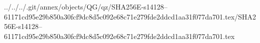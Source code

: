 ../../../.git/annex/objects/QG/qz/SHA256E-s14128--61171cd95e29b850a30fcf9dc8d5c092e68c71e279fde2ddcd1aa31f077da701.tex/SHA256E-s14128--61171cd95e29b850a30fcf9dc8d5c092e68c71e279fde2ddcd1aa31f077da701.tex